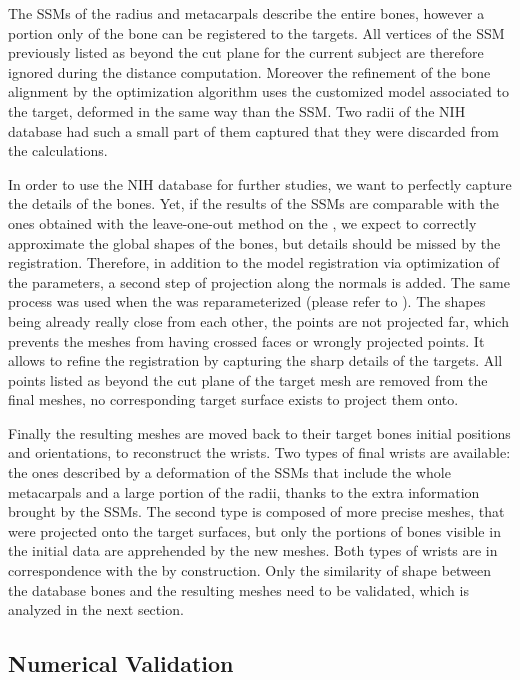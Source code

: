 The SSMs of the radius and metacarpals describe the entire bones, however a portion only of the bone can be registered to the targets. All vertices of the SSM previously listed as beyond the cut plane for the current subject are therefore ignored during the distance computation. Moreover the refinement of the bone alignment by the optimization algorithm uses the customized model associated to the target, deformed in the same way than the SSM. Two radii of the NIH database had such a small part of them captured that they were discarded from the calculations. 

In order to use the NIH database for further studies, we want to perfectly capture the details of the bones. Yet, if the results of the SSMs are comparable with the ones obtained with the leave-one-out method on the \db*, we expect to correctly approximate the global shapes of the bones, but details should be missed by the registration. Therefore, in addition to the model registration via optimization of the parameters, a second step of projection along the normals is added. The same process was used when the \db* was reparameterized (please refer to ). The shapes being already really close from each other, the points are not projected far, which prevents the meshes from having crossed faces or wrongly projected points. It allows to refine the registration by capturing the sharp details of the targets. All points listed as beyond the cut plane of the target mesh are removed from the final meshes, no corresponding target surface exists to project them onto. 

Finally the resulting meshes are moved back to their target bones initial positions and orientations, to reconstruct the wrists. Two types of final wrists are available: the ones described by a deformation of the SSMs that include the whole metacarpals and a large portion of the radii, thanks to the extra information brought by the SSMs. The second type is composed of more precise meshes, that were projected onto the target surfaces, but only the portions of bones visible in the initial data are apprehended by the new meshes. Both types of wrists are in correspondence with the \db* by construction. Only the similarity of shape between the database bones and the resulting meshes need to be validated, which is analyzed in the next section. 


\subsection{Numerical Validation}


